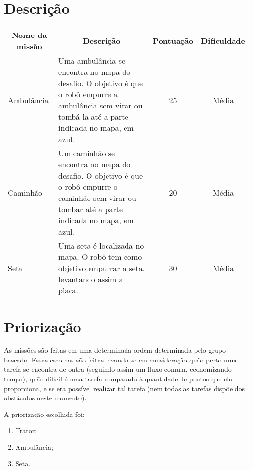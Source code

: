 \section{Descrição}

\begin{table}[h]
\begin{tabular}{|l|p{8cm}|c|c|}
\hline
\multicolumn{1}{|c|}{\textbf{Nome da missão}} & \multicolumn{1}{c|}{\textbf{Descrição}}                                                                                                                  & \multicolumn{1}{c|}{\textbf{Pontuação}} & \multicolumn{1}{c|}{\textbf{Dificuldade}} \\ \hline
Ambulância                                    & Uma ambulância se encontra no mapa do desafio. O objetivo é que o robô empurre a ambulância sem virar ou tombá-la até a parte indicada no mapa, em azul. & 25                                      & Média                                     \\ \hline
Caminhão                                      & Um caminhão se encontra no mapa do desafio. O objetivo é que o robô empurre o caminhão sem virar ou tombar até a parte indicada no mapa, em azul.        & 20                                      & Média                                     \\ \hline
Seta                                          & Uma seta é localizada no mapa. O robô tem como objetivo empurrar a seta, levantando assim a placa.                                                       & 30                                      & Média                                     \\ \hline
\end{tabular}
\end{table}

\section{Priorização}

As missões são feitas em uma determinada ordem determinada pelo grupo baseado. Essas escolhas são feitas levando-se em consideração quão perto uma tarefa se encontra de outra (seguindo assim um fluxo comum, economizando tempo), quão dificil é uma tarefa comparado à quantidade de pontos que ela proporciona, e se era possível realizar tal tarefa (nem todas as tarefas dispõe dos obstáculos neste momento).

A priorização escolhida foi:

\begin{enumerate}
\item Trator;
\item Ambulância;
\item Seta.
\end{enumerate}

